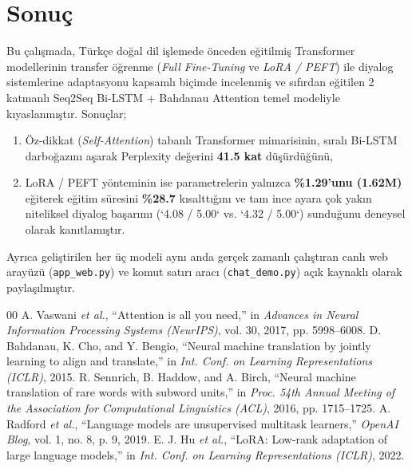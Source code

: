 \documentclass[conference]{IEEEtran}
\begin{document}
\section{Sonuç}
Bu çalışmada, Türkçe doğal dil işlemede önceden eğitilmiş Transformer modellerinin transfer öğrenme (\textit{Full Fine-Tuning} ve \textit{LoRA / PEFT}) ile diyalog sistemlerine adaptasyonu kapsamlı biçimde incelenmiş ve sıfırdan eğitilen 2 katmanlı Seq2Seq Bi-LSTM + Bahdanau Attention temel modeliyle kıyaslanmıştır. Sonuçlar;
\begin{enumerate}
    \item Öz-dikkat (\textit{Self-Attention}) tabanlı Transformer mimarisinin, sıralı Bi-LSTM darboğazını aşarak Perplexity değerini \textbf{41.5 kat} düşürdüğünü,
    \item LoRA / PEFT yönteminin ise parametrelerin yalnızca \textbf{\%1.29'unu (1.62M)} eğiterek eğitim süresini \textbf{\%28.7} kısalttığını ve tam ince ayara çok yakın niteliksel diyalog başarımı (`4.08 / 5.00` vs. `4.32 / 5.00`) sunduğunu deneysel olarak kanıtlamıştır.
\end{enumerate}
Ayrıca geliştirilen her üç modeli aynı anda gerçek zamanlı çalıştıran canlı web arayüzü (\texttt{app\_web.py}) ve komut satırı aracı (\texttt{chat\_demo.py}) açık kaynaklı olarak paylaşılmıştır.

\begin{thebibliography}{00}
 A. Vaswani \textit{et al.}, ``Attention is all you need,'' in \textit{Advances in Neural Information Processing Systems (NeurIPS)}, vol. 30, 2017, pp. 5998--6008.
 D. Bahdanau, K. Cho, and Y. Bengio, ``Neural machine translation by jointly learning to align and translate,'' in \textit{Int. Conf. on Learning Representations (ICLR)}, 2015.
 R. Sennrich, B. Haddow, and A. Birch, ``Neural machine translation of rare words with subword units,'' in \textit{Proc. 54th Annual Meeting of the Association for Computational Linguistics (ACL)}, 2016, pp. 1715--1725.
 A. Radford \textit{et al.}, ``Language models are unsupervised multitask learners,'' \textit{OpenAI Blog}, vol. 1, no. 8, p. 9, 2019.
 E. J. Hu \textit{et al.}, ``LoRA: Low-rank adaptation of large language models,'' in \textit{Int. Conf. on Learning Representations (ICLR)}, 2022.
\end{thebibliography}
\end{document}

